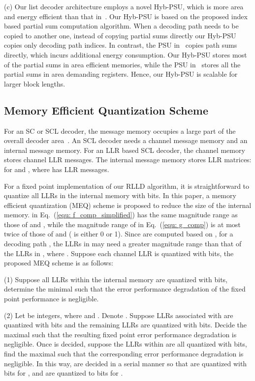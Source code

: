 \documentclass[journal]{IEEEtran}
\begin{document}
(c) Our list decoder architecture employs a novel Hyb-PSU, which is more area and energy efficient than that in~\cite{jun_low_mem_list}. Our Hyb-PSU is based on the proposed index based partial sum computation algorithm. When a decoding path needs to be copied to another one, instead of copying partial sums directly our Hyb-PSU copies only decoding path indices. In contrast, the PSU in~\cite{jun_low_mem_list} copies path sums directly, which incurs additional energy consumption. Our Hyb-PSU stores most of the partial sums in area efficient memories, while the PSU in~\cite{jun_low_mem_list} stores all the partial sums in area demanding registers. Hence, our Hyb-PSU is scalable for larger block lengths.






\subsection{Memory Efficient Quantization Scheme}
\label{sec: quan}
For an SC or SCL decoder, the message memory occupies a large part of the overall decoder area~\cite{gross_polar1, jun_low_mem_list}. An SCL decoder needs a channel message memory and an internal message memory. For an LLR based SCL decoder, the channel memory stores  channel LLR messages. The internal message memory stores  LLR matrices:  for  and , where  has  LLR messages.

For a fixed point implementation of our RLLD algorithm, it is straightforward to quantize all LLRs in the internal memory with  bits.
In this paper, a memory efficient quantization (MEQ) scheme is proposed to reduce the size of the internal memory.  in Eq.~(\ref{equ: f_comp_simplified}) has the same magnitude range as those of  and , while the magnitude range of  in Eq.~(\ref{equ: g_comp}) is at most twice of those of  and  ( is either 0 or 1). Since  are computed based on , for a decoding path , the LLRs in  may need a greater magnitude range than that of the LLRs in , where . Suppose each channel LLR is quantized with  bits, the proposed MEQ scheme is as follows:

(1) Suppose all LLRs within the internal memory are quantized with  bits, determine the minimal  such that the error performance degradation of the fixed point performance is negligible.

(2) Let  be  integers, where  and . Denote . Suppose LLRs associated with  are quantized with  bits and the remaining LLRs are quantized with  bits. Decide the maximal  such that the resulting fixed point error performance degradation is negligible. Once  is decided, suppose the LLRs within  are all quantized with  bits, find the maximal  such that the corresponding error performance degradation is negligible. In this way,  are decided in a serial manner so that  are quantized with  bits for , and  are quantized to  bits for .
\end{document}
